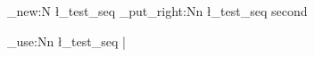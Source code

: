 \ExplSyntaxOn
\seq_new:N \l_test_seq
\seq_put_right:Nn \l_test_seq {second}

\seq_use:Nn \l_test_seq {|}
\ExplSyntaxOff
